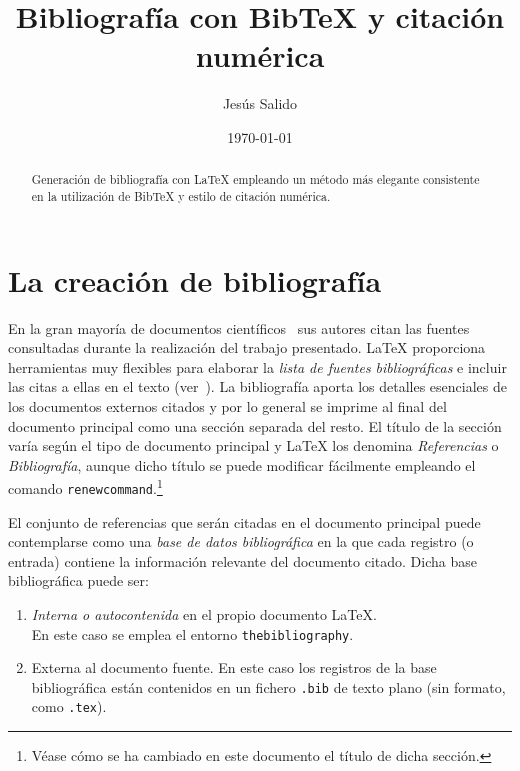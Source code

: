 \documentclass[11pt,a4paper]{article}
\author{Jesús Salido}
\title{Bibliografía con Bib\TeX{} y citación numérica}
\date{\today}
\begin{document}
\maketitle


\begin{abstract}
Generación de bibliografía con \LaTeX{} empleando un método más elegante consistente en la utilización de Bib\TeX{} \cite{wikibookLaTex10} y estilo de citación numérica.
\end{abstract}



\section{La creación de bibliografía}
En la gran mayoría de documentos científicos~\cite[pág.~5]{salido15} sus autores citan las fuentes consultadas durante la realización del trabajo presentado. \LaTeX{} proporciona herramientas muy flexibles para elaborar la \emph{lista de fuentes bibliográficas} e incluir las citas a ellas en el texto (ver~\cite{cascales00,cascales03,goos04,kopka04,lamport94}). La bibliografía aporta los detalles esenciales de los documentos externos citados y por lo general se imprime al final del documento principal como una sección separada del resto. El título de la sección varía según el tipo de documento principal y \LaTeX{} los denomina \emph{Referencias} o \emph{Bibliografía}, aunque dicho título se puede modificar fácilmente empleando el comando \texttt{renewcommand}.\footnote{Véase cómo se ha cambiado en este documento el título de dicha sección.}


El conjunto de referencias que serán citadas en el documento principal puede contemplarse como una \emph{base de datos bibliográfica} en la que cada registro (o entrada) contiene la información relevante del documento citado. Dicha base bibliográfica puede ser:
\begin{enumerate}
	\item \emph{Interna o autocontenida} en el propio documento \LaTeX{}.\\
	 En este caso se emplea el entorno \texttt{thebibliography}.
	
	\item Externa al documento fuente. En este caso los registros de la base bibliográfica están contenidos en un fichero \texttt{.bib} de texto plano (sin formato, como \texttt{.tex}).
\end{enumerate}
\end{document}
